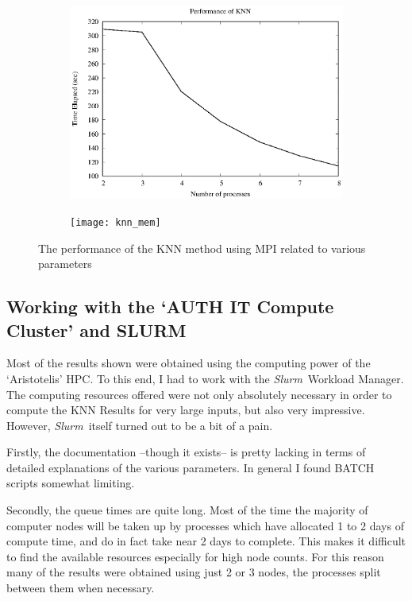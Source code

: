 \documentclass[10pt, a4paper]{article}
\newcommand{\slurm}{\textit{Slurm}}
\begin{document}
\begin{figure}[h]
	\begin{subfigure}{.4\textwidth}
		\centering
		\includegraphics[width=\linewidth]{knn_p}
	\end{subfigure}%
	\begin{subfigure}{.4\textwidth}
		\centering
		\texttt{[image: knn\_mem]}
	\end{subfigure}

	\caption{The performance of the KNN method using MPI related to various parameters}
	\label{knn}
\end{figure}

\subsection{Working with the `AUTH IT Compute Cluster' and SLURM}
Most of the results shown were obtained using the computing power of the `Aristotelis' HPC. To this end, 
I had to work with the \slurm \ Workload Manager. The computing resources offered were not only 
absolutely necessary in order to compute the KNN Results for very large inputs, but also very impressive.
However, \slurm \ itself turned out to be a bit of a pain. 

Firstly, the documentation --though it exists-- is pretty lacking in terms of detailed
explanations of the various parameters. In general I found BATCH scripts somewhat limiting.

Secondly, the queue times are quite long. Most of the time the majority of computer nodes will be taken up by
processes which have allocated 1 to 2 days of compute time, and do in fact take near 2 days to complete. 
This makes it difficult to find the available resources especially for high node counts.
For this reason many of the results were obtained using just 2 or 3 nodes, the processes split between them
when necessary.
\end{document}
